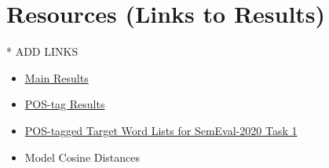\section{Resources (Links to Results)}
\label{app-resources}

* ADD LINKS
\begin{itemize}

  \item \href{https://github.com/kateviloria/Semantic-Change-Thesis/blob/main/results/MAIN_ALL.csv}{Main Results}
  \item \href{https://github.com/kateviloria/Semantic-Change-Thesis/blob/main/results/postag-results/MAIN_POS_RESULTS.csv}{POS-tag Results}
  \item \href{https://github.com/kateviloria/Semantic-Change-Thesis/tree/main/truth-labels}{POS-tagged Target Word Lists for SemEval-2020 Task 1}
  \item Model Cosine Distances

\end{itemize}